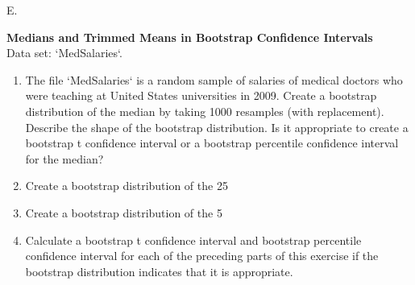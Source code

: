 \documentclass[
]{report}
\newcounter{excount}
\renewcommand{\theexcount}{E\arabic{excount}}
\begin{document}
\begin{list}{\theexcount.}{ \setlength{\itemsep}{0.5em}}
  \item \textbf{Medians and Trimmed Means in Bootstrap Confidence Intervals} \\
  Data set: `MedSalaries`. 
  \begin{enumerate}
    \setcounter{enumi}{0}  
    \item The file `MedSalaries` is a random sample of salaries of medical doctors who were teaching at United States universities in 2009. Create a bootstrap distribution of the median by taking 1000 resamples (with replacement). Describe the shape of the bootstrap distribution. Is it appropriate to create a bootstrap t confidence interval or a bootstrap percentile confidence interval for the median?
    \item Create a bootstrap distribution of the 25%
    \item Create a bootstrap distribution of the 5%
    \item Calculate a bootstrap t confidence interval and bootstrap percentile confidence interval for each of the preceding parts of this exercise if the bootstrap distribution indicates that it is appropriate.
  \end{enumerate}
  
  
  

\end{list}
\end{document}
